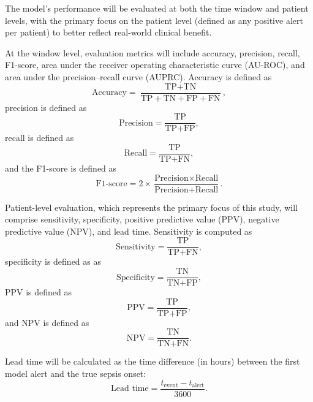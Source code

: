 \documentclass[conference]{IEEEtran}
\begin{document}
The model’s performance will be evaluated at both the time window and patient levels, with the primary focus on the patient level (defined as any positive alert per patient) to better reflect real-world clinical benefit.

At the window level, evaluation metrics will include accuracy, precision, recall, F1-score, area under the receiver operating characteristic curve (AU-ROC), and area under the precision–recall curve (AUPRC). Accuracy is defined as
\begin{equation}
\text{Accuracy} = \frac{\text{TP} + \text{TN}}{\text{TP} + \text{TN} + \text{FP} + \text{FN}},
\end{equation}
precision is defined as
\begin{equation}
\text{Precision} = \frac{\text{TP}}{\text{TP} + \text{FP}},
\end{equation}
recall is defined as
\begin{equation}
\text{Recall} = \frac{\text{TP}}{\text{TP} + \text{FN}},
\end{equation}
and the F1-score is defined as
\begin{equation}
\text{F1-score} = 2 \times \frac{\text{Precision} \times \text{Recall}}{\text{Precision} + \text{Recall}}.
\end{equation}

Patient-level evaluation, which represents the primary focus of this study, will comprise sensitivity, specificity, positive predictive value (PPV), negative predictive value (NPV), and lead time. Sensitivity is computed as
\begin{equation}
\text{Sensitivity} = \frac{\text{TP}}{\text{TP} + \text{FN}},
\end{equation}
specificity is defined as as\begin{equation}
\text{Specificity} = \frac{\text{TN}}{\text{TN} + \text{FP}},
\end{equation}
PPV is defined as\begin{equation}
\text{PPV} = \frac{\text{TP}}{\text{TP} + \text{FP}},
\end{equation}
and NPV is defined as\begin{equation}
\text{NPV} = \frac{\text{TN}}{\text{TN} + \text{FN}}.
\end{equation}

Lead time will be calculated as the time difference (in hours) between the first model alert and the true sepsis onset:
\begin{equation}
\text{Lead time} = \frac{t_{\text{event}} - t_{\text{alert}}}{3600}.
\end{equation}
\end{document}
